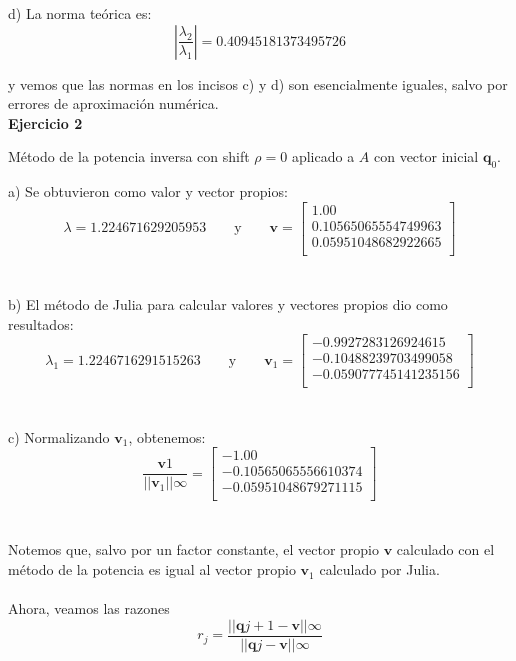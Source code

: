 \documentclass[11pt]{article}
\begin{document}
d) La norma teórica es:
$$
\left| \frac{\lambda_2}{\lambda_1} \right| = 0.40945181373495726
$$

y vemos que las normas en los incisos c) y d) son esencialmente iguales, salvo por errores de aproximación numérica.
\\

\noindent
\textbf{Ejercicio 2}

\noindent
Método de la potencia inversa con shift $\rho = 0$ aplicado a $A$ con vector inicial $\textbf{q}_0$.

a) Se obtuvieron como valor y vector propios:
 \[
 \lambda = 1.224671629205953
 \qquad\text{y}\qquad
 \textbf{v} = \begin{bmatrix}
1.00 \\
0.10565065554749963 \\
0.05951048682922665 \\
\end{bmatrix}
 \]
 \\
 \\

b) El método de Julia para calcular valores y vectores propios dio como resultados:
\[
 \lambda_1 = 1.2246716291515263
 \qquad\text{y}\qquad
 \textbf{v}_1 = \begin{bmatrix}
-0.9927283126924615 \\
-0.10488239703499058 \\
-0.059077745141235156 \\
\end{bmatrix}
 \]
 \\
 \\

 c) Normalizando $\textbf{v}_1$, obtenemos:
 $$\frac{\textbf{v}1}{||\textbf{v}_1||\infty} =
\begin{bmatrix}
-1.00 \\
-0.10565065556610374 \\
-0.05951048679271115 \\
\end{bmatrix}$$
\\
\\

Notemos que, salvo por un factor constante, el vector propio $\textbf{v}$ calculado con el método de la potencia es igual al vector propio $\textbf{v}_1$ calculado por Julia.
\\
\\

Ahora, veamos las razones
$$
r_j = \frac{||\textbf{q}{j+1} - \textbf{v}||\infty}{||\textbf{q}{j} - \textbf{v}||\infty}
$$
\\
\end{document}
